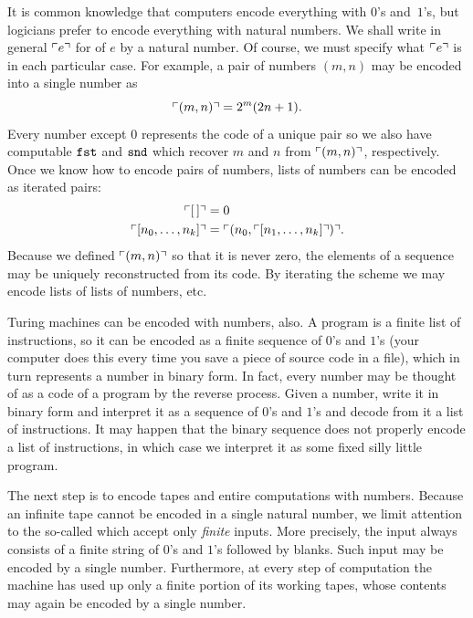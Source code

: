 It is common knowledge that computers encode everything with $0$'s and~$1$'s, but logicians prefer to encode everything with natural numbers.
We shall write in general $\ulcorner e \urcorner$ for  of $e$ by a natural
number. Of course, we must specify what $\ulcorner e \urcorner$ is in each
particular case. For example, a pair of numbers $(m, n)$ may be
encoded into a single number as
%
\begin{equation*}
  \ulcorner (m, n) \urcorner = 2^m (2 n + 1).
\end{equation*}
%
Every number except $0$ represents the code of a unique pair so we
also have computable  $\mathtt{fst}$ and $\mathtt{snd}$ which
recover $m$ and $n$ from $\ulcorner (m, n) \urcorner$, respectively.
Once we know how to encode pairs of numbers, lists of numbers can be encoded as iterated pairs:
%
\begin{align*}
  \ulcorner [\,] \urcorner &= 0 \\
  \ulcorner [n_0, \ldots, n_k] \urcorner &= \ulcorner (n_0, \ulcorner [n_1, \ldots, n_k] \urcorner) \urcorner.
\end{align*}
%
Because we defined $\ulcorner (m,n) \urcorner$ so that it is never zero, the
elements of a sequence may be uniquely reconstructed from its code.
By iterating the scheme we may encode lists of lists of numbers, etc.

Turing machines can be encoded with numbers, also. A program is a finite
list of instructions, so it can be encoded as a finite sequence of
$0$'s and $1$'s (your computer does this every time you save a piece of
source code in a file), which in turn represents a number in binary
form. In fact, every number may be thought of as a code of a program
by the reverse process. Given a number, write it in binary form and
interpret it as a sequence of $0$'s and $1$'s and decode from it a
list of instructions. It may happen that the binary sequence does not
properly encode a list of instructions, in which case we interpret it
as some fixed silly little program.

The next step is to encode tapes and entire computations with numbers.
Because an infinite tape cannot be encoded in a single natural number,
we limit attention to the so-called  which
accept only \emph{finite} inputs. More precisely, the input always
consists of a finite string of $0$'s and $1$'s followed by blanks.
Such input may be encoded by a single number. Furthermore, at every
step of computation the machine has used up only a finite portion of
its working tapes, whose contents may again be encoded by a single number.

